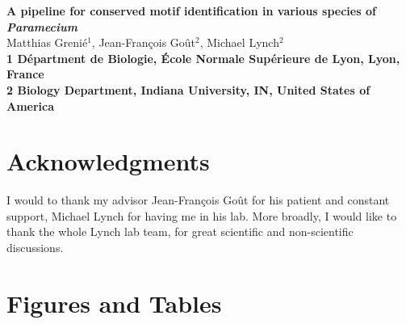 \documentclass[10pt]{article}
\date{}
\begin{document}
\begin{flushleft}
{\Large
\textbf{A pipeline for conserved motif identification in various species of \textit{Paramecium}}
}
\\
Matthias Grenié$^{1}$, 
Jean-François Goût$^{2}$, 
Michael Lynch$^{2}$
\\
\bf{1} Départment de Biologie, École Normale Supérieure de Lyon, Lyon, France
\\
\bf{2} Biology Department, Indiana University, IN, United States of America
\\
\end{flushleft}











\section*{Acknowledgments}

I would to thank my advisor Jean-François Goût for his patient and constant support, Michael Lynch for having me in his lab. More broadly, I would like to thank the whole Lynch lab team, for great scientific and non-scientific discussions.

\section*{Figures and Tables}
\end{document}

